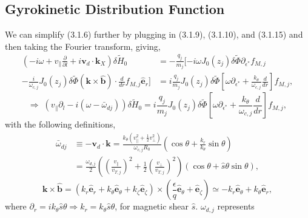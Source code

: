 \documentclass[12pt]{article}
\numberwithin{equation}{subsection}
\begin{document}
\subsection{Gyrokinetic Distribution Function}
   \quad We can simplify (3.1.6) further by plugging in (3.1.9), (3.1.10), and (3.1.15) and then taking the Fourier transform, giving,
   \begin{equation}
   \begin{aligned}
      (-i\omega + v_\parallel\frac{\partial}{\partial l} + i \bm{v}_d\cdot\bm{k}_X)\delta\widetilde{H}_0 &=
      -\frac{q_j}{m_j}[-i\omega J_0(z_j)\delta\widetilde{\Phi}\partial_{\epsilon^*}f_{M,j} \\
      -\frac{i}{\omega_{c,j}}J_0(z_j)\delta\widetilde{\Phi}(\bm{k}\times\bm{\hat{b}})\cdot\frac{d}{dr} f_{M,j}\bm{\hat{e}}_r] &=
      i\frac{q_j}{m_j}J_0(z_j)\delta\widetilde{\Phi}[\omega\partial_{\epsilon^*} + \frac{k_\theta}{\omega_{c,j}}\frac{d}{dr}]f_{M,j},
   \end{aligned}
   \end{equation}
   \begin{equation}
      \Rightarrow\; (v_\parallel\partial_l - i(\omega - \bar{\omega}_{dj}))\delta\widetilde{H}_0 =
      i\frac{q_j}{m_j}J_0(z_j)\delta\widetilde{\Phi}[\omega\partial_{\epsilon^*} + \frac{k_\theta}{\omega_{c,j}}\frac{d}{dr}]f_{M,j},
   \end{equation}
with the following definitions,
   \begin{equation}
   \begin{aligned}
      \bar{\omega}_{dj} &\equiv -\bm{v}_d\cdot\bm{k} = \frac{k_\theta(v_\parallel^2 + \frac{1}{2}v_\perp^2)}{\omega_{c,j}R_0}(\cos\theta
                                + \frac{k_r}{k_\theta}\sin\theta) \\
                        &= \frac{\omega_{d,j}}{2}(\left(\frac{v_\parallel}{v_{T,j}}\right)^2 + \frac{1}{2}\left(\frac{v_\perp}{v_{T,j}}\right)^2)
                           (\cos\theta + \hat{s}\theta\sin\theta),  
   \end{aligned}
   \end{equation}
   \begin{equation}
      \bm{k}\times\bm{\hat{b}} = (k_r\bm{\hat{e}}_r + k_\theta\bm{\hat{e}}_\theta + k_\zeta\bm{\hat{e}}_\zeta)\times
      (\frac{\epsilon}{q}\bm{\hat{e}}_\theta + \bm{\hat{e}}_\zeta) \simeq -k_r\bm{\hat{e}}_\theta + k_\theta\bm{\hat{e}}_r,
   \end{equation}
where $\partial_r = i k_\theta\hat{s}\theta \Rightarrow k_r = k_\theta\hat{s}\theta$, for magnetic shear $\hat{s}$\cite{HC}. $\omega_{d,j}$ represents
\end{document}
